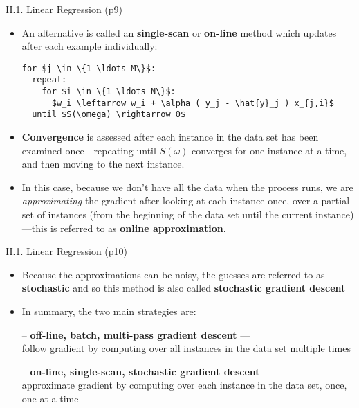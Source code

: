 \documentclass[handout]{beamer}
\newcommand{\strong}[1]{\textbf{\color{teal} #1}}
\newcommand{\stronger}[1]{\textbf{\color{purple} #1}}
\begin{document}
\begin{frame}[fragile]{II.1. Linear Regression (p9)}
\begin{itemize}
\item An alternative is called an \strong{single-scan} or \strong{on-line} method which updates after each example individually:
\begin{lstlisting}
for $j \in \{1 \ldots M\}$:
  repeat:
    for $i \in \{1 \ldots N\}$:
      $w_i \leftarrow w_i + \alpha ( y_j - \hat{y}_j ) x_{j,i}$
  until $S(\omega) \rightarrow 0$
\end{lstlisting}
\item \strong{Convergence} is assessed after each instance in the data set has been examined once---repeating until $S(\omega)$ converges for one instance at a time, and then moving to the next instance.
\item In this case, because we don't have all the data when the process runs, we are \emph{approximating} the gradient after looking at each instance once, over a partial set of instances (from the beginning of the data set until the current instance)---this is referred to as \strong{online approximation}.
\end{itemize}
\end{frame}
\begin{frame}[fragile]{II.1. Linear Regression (p10)}
\begin{itemize}
\item Because the approximations can be noisy, the guesses are referred to as \strong{stochastic} and so this method is also called \stronger{stochastic gradient descent}
\item[]
\item In summary, the two main strategies are:
\item[--] \strong{off-line, batch, multi-pass gradient descent} --- \\
follow gradient by computing over all instances in the data set multiple times
\item[--] \strong{on-line, single-scan, stochastic gradient descent} --- \\
approximate gradient by computing over each instance in the data set, once, one at a time
\end{itemize}
\end{frame}
\end{document}
